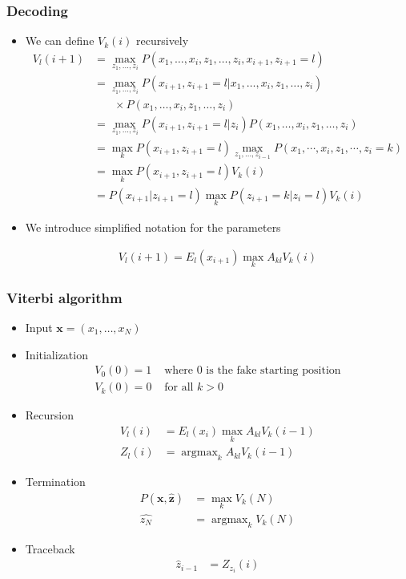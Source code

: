 \documentclass[usenames,dvipsnames]{beamer}
\DeclareMathOperator*{\argmax}{argmax}
\newcommand{\x}{\mathbf{x}}
\newcommand{\z}{\mathbf{z}}
\begin{document}
\begin{frame}
  \frametitle{Decoding}
  \begin{itemize}
  \item We can define $V_k(i)$ recursively
    \begin{align*}
      V_l(i+1) & = \max_{z_1,\ldots,z_i}
      P(x_1,\ldots,x_i,z_1,\ldots,z_i,x_{i+1},z_{i+1} = l)\\
      & = \max_{z_1,\ldots,z_i}
      P(x_{i+1},z_{i+1}=l|x_1,\ldots,x_i,z_1,\ldots,z_i)\\
      & ~~~~~~~~ \times P(x_1,\ldots,x_i,z_1,\ldots,z_i)\\
      & = \max_{z_1,\ldots,z_i}
        P(x_{i+1},z_{i+1}=l|z_i)P(x_1,\ldots,x_i,z_1,\ldots,z_i)\\
      & = \max_k P(x_{i+1},z_{i+1} = l) \max_{  z_1,\ldots,z_{i-1}}
      P(x_1,\cdots,x_{i},z_1,\cdots,z_i=k)\\
      & = \max_k P(x_{i+1},z_{i+1} = l) V_k(i)\\
      & = P(x_{i+1}|z_{i+1} = l) \max_k P(z_{i+1}=k|z_{i}=l) V_k(i)
    \end{align*}
\item We introduce simplified notation for the parameters
  \begin{block}{}
    \begin{align*}
      V_l(i+1) = E_l(x_{i+1}) \max_k A_{kl} V_k(i)
    \end{align*}
  \end{block}
  \end{itemize}
\end{frame}

\begin{frame}
  \frametitle{Viterbi algorithm}
  \begin{block}
    {}
    \begin{itemize}
    \item Input $\x = (x_1,\ldots,x_N)$
    \item Initialization
      \begin{align*}
        V_0(0) = 1 & \text{ where 0 is the fake starting position}\\
        V_k(0) = 0 & \text{ for all } k > 0
      \end{align*}
    \item Recursion
      \begin{align*}
        V_l(i) & = E_l(x_{i}) \max_k A_{kl} V_k(i-1)\\
        Z_l(i) & = \argmax_k A_{kl} V_k(i-1)
      \end{align*}
    \item Termination
      \begin{align*}
        P(\x,\hat{\z}) & = \max_k V_k(N)\\
        \hat{z_N} & = \argmax_k V_k(N)
      \end{align*}
    \item  Traceback
      \begin{align*}
        \hat{z}_{i-1} & = Z_{z_i}(i)
      \end{align*}
    \end{itemize}
  \end{block}
\end{frame}
\end{document}
